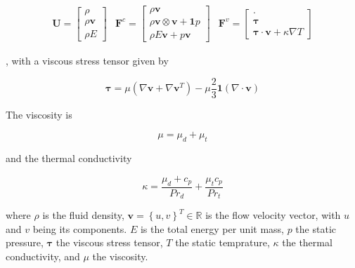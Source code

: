 \begin{eqnarray}
   \mathbf{U} = \begin{bmatrix} \rho \\ \rho \mathbf{v} \\ \rho E \end{bmatrix} 
   & \mathbf{F}^c = \begin{bmatrix} \rho \mathbf{v}  \\ \rho \mathbf{v}\otimes \mathbf{v} + \mathbf{1} p \\ \rho E \mathbf{v} + p \mathbf{v} \end{bmatrix} 
   & \mathbf{F}^v = \begin{bmatrix} \cdot \\ \boldsymbol{\tau} \\ \boldsymbol{\tau} \cdot \mathbf{v} + \kappa \nabla T \end{bmatrix} 
   \label{eq:ns_equations}
\end{eqnarray}

, with a viscous stress tensor given by 

\begin{equation}
    \boldsymbol{\tau} = \mu \left( \nabla \mathbf{v} + \nabla \mathbf{v}^T \right) - \mu \frac{2}{3} \mathbf{1} \left( \nabla \cdot \mathbf{v} \right)
    \label{eq:ns_stress_tensor}
\end{equation}

The viscosity is

\begin{equation}
    \mu = \mu_d + \mu_t
    \label{eq:mu}
\end{equation}

and the thermal conductivity

\begin{equation}
    \kappa = \frac{\mu_d + c_p}{Pr_d} + \frac{\mu_t c_p}{Pr_t}
    \label{eq:kappa}
\end{equation}

where $\rho$ is the fluid density, $\mathbf{v} = \left\{ u , v \right\}^T \in \mathbb{R}$ is the flow velocity vector, with $u$ and $v$ being its components. $E$ is the total energy per unit mass, $p$ the static pressure, $\boldsymbol{\tau}$ the viscous stress tensor, $T$ the static temprature, $\kappa$ the thermal conductivity, and $\mu$ the viscosity.

